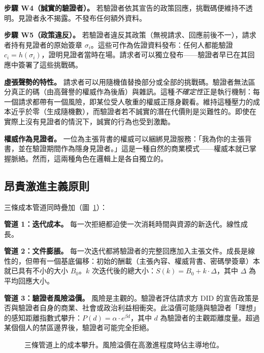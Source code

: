 \documentclass[11pt,a4paper,twocolumn]{article}
\begin{document}
\textbf{步驟 W4（誠實的驗證者）。} 若驗證者依其宣告的政策回應，挑戰碼便維持不透明。見證者永不揭露。不發布任何額外資料。

\textbf{步驟 W5（政策違反）。} 若驗證者違反其政策（無視請求、回應前後不一），請求者持有見證者的原始簽章 $\sigma_i$。這些可作為佐證資料發布：任何人都能驗證 $c_i = h(\sigma_i)$，證明見證者當時在場。請求者可以獨立發布——驗證者早已在其回應中簽署了這些挑戰碼。

\textbf{虛張聲勢的特性。} 請求者可以用隨機值替換部分或全部的挑戰碼。驗證者無法區分真正的碼（由高聲譽的權威作為後盾）與雜訊。這種\emph{不確定性}正是執行機制：每一個請求都帶有一個風險，即某位受人敬重的權威正隱身觀看。維持這種壓力的成本近乎於零（生成隨機數），而驗證者若不誠實的潛在代價則是災難性的。即使在實際上沒有見證者的情況下，誠實的行為也受到激勵。

\textbf{權威作為見證者。} 一位為主張背書的權威可以綑綁見證服務：「我為你的主張背書，並在驗證期間作為隱身見證者。」這是一種自然的商業模式——權威本就已掌握脈絡。然而，這兩種角色在邏輯上是各自獨立的。

\subsection{昂貴激進主義原則}

三條成本管道同時疊加（圖~\ref{fig:radicalism}）：

\textbf{管道 1：迭代成本。} 每一次拒絕都迫使一次消耗時間與資源的新迭代。線性成長。

\textbf{管道 2：文件膨脹。} 每一次迭代都將驗證者的完整回應加入主張文件。成長是線性的，但帶有一個基底偏移：初始的酬載（主張內容、權威背書、密碼學簽章）本就已具有不小的大小 $B_0$。$k$ 次迭代後的總大小：$S(k) = B_0 + k \cdot \Delta$，其中 $\Delta$ 為平均回應大小。

\textbf{管道 3：驗證者風險溢價。} 風險是主觀的。驗證者評估請求方 DID 的宣告政策是否與驗證者自身的商業、社會或政治利益相衝突。此溢價可能隨與驗證者「理想」的感知距離指數式攀升：$P(d) = \alpha \cdot e^{\beta d}$，其中 $d$ 為驗證者的主觀距離度量。超過某個個人的禁區邊界後，驗證者可能完全拒絕。

\begin{figure}[ht]
\centering
{}
\caption{三條管道上的成本攀升。風險溢價在高激進程度時佔主導地位。}
\label{fig:radicalism}
\end{figure}
\end{document}
